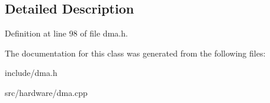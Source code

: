 \subsection{Detailed Description}


Definition at line 98 of file dma.\-h.



The documentation for this class was generated from the following files\-:\begin{DoxyCompactItemize}
\item 
include/dma.\-h\item 
src/hardware/dma.\-cpp\end{DoxyCompactItemize}
